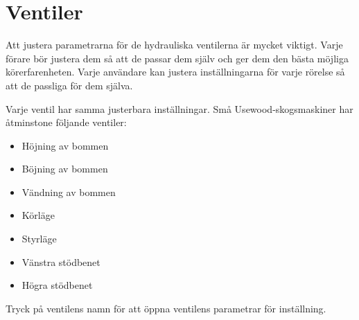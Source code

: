 \documentclass[12pt,a4paper,finnish]{uvmanual}
\begin{document}
\section{Ventiler}\label{ch:settings_valves}

Att justera parametrarna för de hydrauliska ventilerna är mycket viktigt. Varje förare bör justera dem så att de passar dem själv och ger dem den bästa möjliga körerfarenheten. Varje användare kan justera inställningarna för varje rörelse så att de passliga för dem själva.




Varje ventil har samma justerbara inställningar. Små Usewood-skogsmaskiner har åtminstone följande ventiler:

\begin{itemize}
 \item Höjning av bommen
 \item Böjning av bommen
 \item Vändning av bommen
 \item Körläge
 \item Styrläge
 \item Vänstra stödbenet
 \item Högra stödbenet
\end{itemize}

Tryck på ventilens namn för att öppna ventilens parametrar för inställning.


\end{document}
